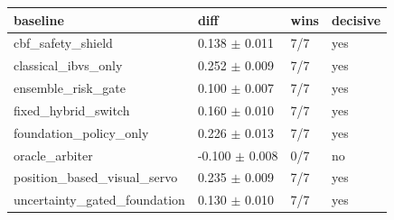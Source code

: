 \begin{tabular}{llll}
\toprule
baseline & diff & wins & decisive \\
\midrule
cbf\_safety\_shield & 0.138 $\pm$ 0.011 & 7/7 & yes \\
classical\_ibvs\_only & 0.252 $\pm$ 0.009 & 7/7 & yes \\
ensemble\_risk\_gate & 0.100 $\pm$ 0.007 & 7/7 & yes \\
fixed\_hybrid\_switch & 0.160 $\pm$ 0.010 & 7/7 & yes \\
foundation\_policy\_only & 0.226 $\pm$ 0.013 & 7/7 & yes \\
oracle\_arbiter & -0.100 $\pm$ 0.008 & 0/7 & no \\
position\_based\_visual\_servo & 0.235 $\pm$ 0.009 & 7/7 & yes \\
uncertainty\_gated\_foundation & 0.130 $\pm$ 0.010 & 7/7 & yes \\
\bottomrule
\end{tabular}
